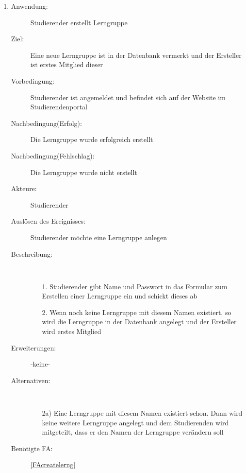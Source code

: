 \documentclass[parskip=full]{scrartcl}
\newcommand{\swtLabel}[1]{\textbf{/#1\arabic*0/}}
\begin{document}
\begin{enumerate}[label=\swtLabel{S}]
  
  \item \label{UCstudCrealernG}
  \begin{description}
  \item[Anwendung:] Studierender erstellt \gls{Lerngruppe}
  \item[Ziel:] Eine neue \gls{Lerngruppe} ist in der Datenbank vermerkt und der
  Ersteller ist erstes Mitglied dieser
  	\item[Vorbedingung:] Studierender ist angemeldet und befindet sich auf der
  	Website im Studierendenportal
  	\item[Nachbedingung(Erfolg):] Die \gls{Lerngruppe} wurde erfolgreich erstellt
  	\item[Nachbedingung(Fehlschlag):] Die \gls{Lerngruppe} wurde nicht erstellt
  	\item[Akteure:] Studierender
  	\item[Auslösen des Ereignisses:] \gls{Studierender} möchte eine Lerngruppe anlegen
  	\item[Beschreibung:]~
  	\begin{enumerate}
  	  \item[1.] Studierender gibt Name und Passwort in das Formular zum Erstellen
  	  einer \gls{Lerngruppe} ein und schickt dieses ab %
  	  \item[2.] Wenn noch keine \gls{Lerngruppe} mit diesem Namen existiert, so
  	  wird die \gls{Lerngruppe} in der Datenbank angelegt und der Ersteller wird
  	  erstes Mitglied
  	\end{enumerate}
  	\item[Erweiterungen:] -keine-
  	\item[Alternativen:] ~
  	\begin{enumerate}
  	  \item[2a)] Eine \gls{Lerngruppe} mit diesem Namen existiert schon. Dann
  	  wird keine weitere \gls{Lerngruppe} angelegt und dem Studierenden wird
  	  mitgeteilt, dass er den Namen der \gls{Lerngruppe} verändern soll
  	 \end{enumerate}
  	 \item[Benötigte FA:] \ref{FAcreatelerng}
  \end{description}
   

\end{enumerate}
\end{document}

